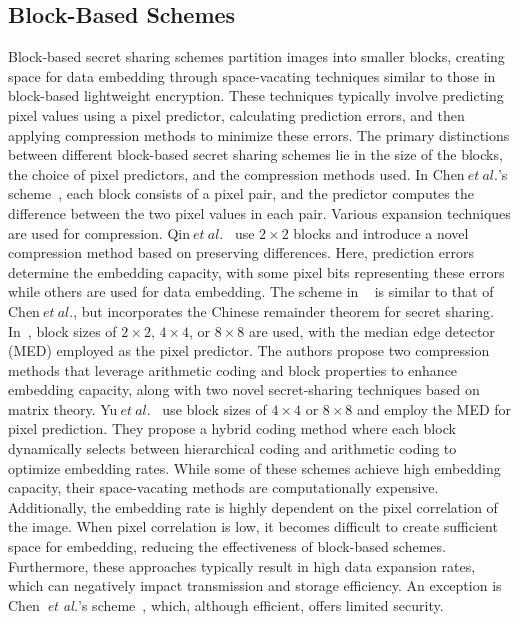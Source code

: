 \subsection{Block-Based Schemes}
Block-based secret sharing schemes partition images into smaller blocks, creating space for data embedding through space-vacating techniques similar to those in block-based lightweight encryption. These techniques typically involve predicting pixel values using a pixel predictor, calculating prediction errors,  and then applying compression methods to minimize these errors. The primary distinctions between different block-based secret sharing schemes lie in the size of the blocks, the choice of pixel predictors, and the compression methods used. In Chen$~et~al.$'s scheme~\cite{chen2019new}, each block consists of a pixel pair, and the predictor computes the difference between the two pixel values in each pair. Various expansion techniques are used for compression.  Qin$~et~al.$~\cite{qin2021reversible} use $2 \times 2$ blocks and introduce a novel compression method based on preserving differences. Here, prediction errors determine the embedding capacity, with some pixel bits representing these errors while others are used for data embedding. The scheme in ~\cite{ke2021reversible} is similar to that of Chen$~et~al.$, but incorporates the Chinese remainder theorem for secret sharing. In~\cite{hua2022matrix,hua_reversible_2023}, block sizes of $2 \times 2$, $4 \times 4$, or $8 \times 8$ are used, with the median edge detector (MED) employed as the pixel predictor. The authors propose two compression methods that leverage arithmetic coding and block properties to enhance embedding capacity, along with two novel secret-sharing techniques based on matrix theory. Yu$~et~al.$~\cite{yu_reversible_2023} use block sizes of $4 \times 4$ or $8 \times 8$ and employ the MED for pixel prediction. They propose a hybrid coding method where each block dynamically selects between hierarchical coding and arithmetic coding to optimize embedding rates. While some of these schemes achieve high embedding capacity, their space-vacating methods are computationally expensive. Additionally, the embedding rate is highly dependent on the pixel correlation of the image. When pixel correlation is low, it becomes difficult to create sufficient space for embedding, reducing the effectiveness of block-based schemes. Furthermore, these approaches typically result in high data expansion rates, which can negatively impact transmission and storage efficiency. An exception is Chen~\textit{et al.}'s scheme~\cite{chen2019new}, which, although efficient, offers limited security.

